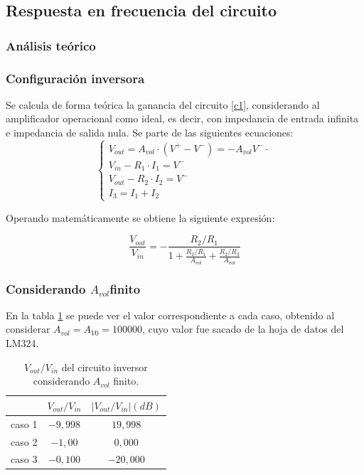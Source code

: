 \subsection{Respuesta en frecuencia del circuito}

\subsubsection{An\'alisis te\'orico} %

\subsubsection*{Configuraci\'on inversora}
Se calcula de forma te\'orica la ganancia del circuito \ref{c1}, 
considerando al amplificador operacional como ideal, es decir, 
con impedancia de entrada infinita e impedancia de salida nula. Se parte de las siguientes ecuaciones:
\begin{equation}
	\begin{cases}
		V_{out} = A_{vol}\cdot(V^+ - V^-) = -A_{vol} V^- \cdot \\
		V_{in} - R_1 \cdot I_1 = V^- \\
		V_{out} - R_2 \cdot I_2 = V^-\\ 
		I_3 = I_1 + I_2
	\end{cases}
	\label{ecsbase}
\end{equation}

Operando matem\'aticamente se obtiene la siguiente expresi\'on:

\begin{equation}
	\frac{V_{out}}{V_{in}} = - \frac{R_2/R_1}{1 + \frac{R_2/R_1}{A_{vol}} + \frac{R_2/R_3}{A_{vol}}}
	\label{c1vovi}
\end{equation}

\subsubsection*{Considerando $A_{vol} $finito}
 
En la tabla \ref{avolf} se puede ver el valor correspondiente a cada caso, obtenido al considerar 
$A_{vol} = A_{V0} = 100000$, cuyo valor fue sacado de la hoja de datos del LM324.

\begin{table}[h!]
	\centering
	\begin{tabular}{c c c}%
		\bfseries  & $V_{out}/V_{in}$ & $|V_{out}/V_{in}| (dB)$ \\ \hline
		caso 1 & $-9,998$ & $19,998$\\
		caso 2 & $ -1,00$ & $0,000$ \\
		caso 3 & $ -0,100$ & $-20,000$\\
		\hline
	\end{tabular}
	\caption{$V_{out}/V_{in}$ del circuito inversor considerando $A_{vol}$ finito.}
	\label{avolf}
\end{table}

